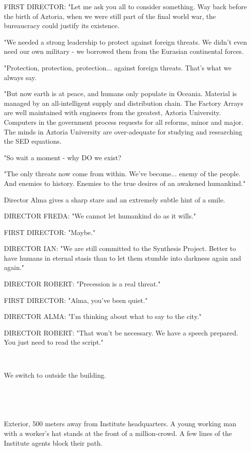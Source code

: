 \documentclass[11pt]{article}
\begin{document}
FIRST DIRECTOR: "Let me ask you all to consider something. 
Way back before the birth of Aztoria, when we were still part of the final world war, the bureaucracy could justify its existence.

"We needed a strong leadership to protect against foreign threats.
We didn't even need our own military - we borrowed them from the Eurasian continental forces.

"Protection, protection, protection... against foreign threats. That's what we always say.

"But now earth is at peace, and humans only populate in Oceania.
Material is managed by an all-intelligent supply and distribution chain.
The Factory Arrays are well maintained with engineers from the greatest, Aztoria University.
Computers in the government process requests for all reforms, minor and major. 
The minds in Aztoria University are over-adequate for studying and researching the SED equations.

"So wait a moment - why DO we exist? 

"The only threats now come from within.
We've become... enemy of the people.
And enemies to history.
Enemies to the true desires of an awakened humankind."

Director Alma gives a sharp stare and an extremely subtle hint of a smile.

DIRECTOR FREDA: "We cannot let humankind do as it wills."

FIRST DIRECTOR: "Maybe."

DIRECTOR IAN: "We are still committed to the Synthesis Project.
Better to have humans in eternal stasis than to let them stumble into darkness again and again."

DIRECTOR ROBERT: "Precession is a real threat."

FIRST DIRECTOR: "Alma, you've been quiet."

DIRECTOR ALMA: "I'm thinking about what to say to the city."

DIRECTOR ROBERT: "That won't be necessary. 
We have a speech prepared. 
You just need to read the script."

\ 

We switch to outside the building.

\ 

\ 

Exterior, 500 meters away from Institute headquarters.
A young working man with a worker's hat stands at the front of a million-crowd.
A few lines of the Institute agents block their path.
\end{document}
